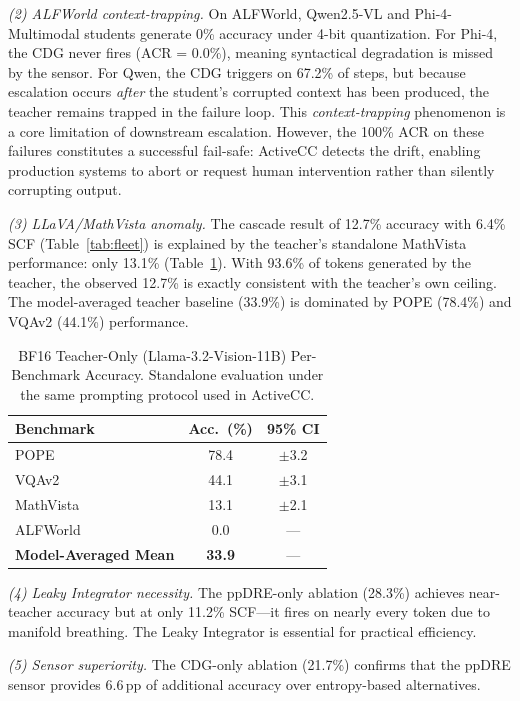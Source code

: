 \documentclass{ieeetmlcn}
\begin{document}
\noindent\emph{(2) ALFWorld context-trapping.} On ALFWorld, Qwen2.5-VL and Phi-4-Multimodal students generate 0\% accuracy under 4-bit quantization. For Phi-4, the CDG never fires (ACR = 0.0\%), meaning syntactical degradation is missed by the sensor. For Qwen, the CDG triggers on 67.2\% of steps, but because escalation occurs \emph{after} the student's corrupted context has been produced, the teacher remains trapped in the failure loop. This \emph{context-trapping} phenomenon is a core limitation of downstream escalation. However, the 100\% ACR on these failures constitutes a successful fail-safe: ActiveCC detects the drift, enabling production systems to abort or request human intervention rather than silently corrupting output.

\noindent\emph{(3) LLaVA/MathVista anomaly.} The cascade result of 12.7\% accuracy with 6.4\% SCF (Table~\ref{tab:fleet}) is explained by the teacher's standalone MathVista performance: only 13.1\% (Table~\ref{tab:teacherperbench}). With 93.6\% of tokens generated by the teacher, the observed 12.7\% is exactly consistent with the teacher's own ceiling. The model-averaged teacher baseline (33.9\%) is dominated by POPE (78.4\%) and VQAv2 (44.1\%) performance.

\begin{table}[htbp]
\caption{BF16 Teacher-Only (Llama-3.2-Vision-11B) Per-Benchmark Accuracy. Standalone evaluation under the same prompting protocol used in ActiveCC.}
\label{tab:teacherperbench}
\centering
\begin{tabular}{lcc}
\toprule
\textbf{Benchmark} & \textbf{Acc.\ (\%)} & \textbf{95\% CI} \\
\midrule
POPE      & 78.4 & $\pm$3.2 \\
VQAv2     & 44.1 & $\pm$3.1 \\
MathVista & 13.1 & $\pm$2.1 \\
ALFWorld  &  0.0 & --- \\
\midrule
\textbf{Model-Averaged Mean} & \textbf{33.9} & --- \\
\bottomrule
\end{tabular}
\end{table}

\noindent\emph{(4) Leaky Integrator necessity.} The ppDRE-only ablation (28.3\%) achieves near-teacher accuracy but at only 11.2\% SCF---it fires on nearly every token due to manifold breathing. The Leaky Integrator is essential for practical efficiency.

\noindent\emph{(5) Sensor superiority.} The CDG-only ablation (21.7\%) confirms that the ppDRE sensor provides 6.6\,pp of additional accuracy over entropy-based alternatives.
\end{document}
